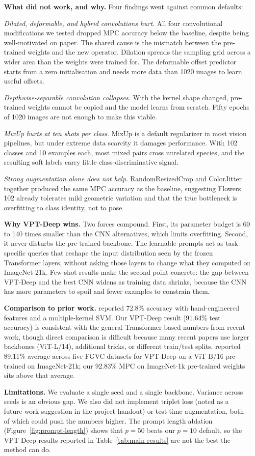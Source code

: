 \textbf{What did not work, and why.} Four findings went against common defaults:

\emph{Dilated, deformable, and hybrid convolutions hurt.} All four convolutional modifications we tested dropped MPC accuracy below the baseline, despite being well-motivated on paper. The shared cause is the mismatch between the pre-trained weights and the new operator. Dilation spreads the sampling grid across a wider area than the weights were trained for. The deformable offset predictor starts from a zero initialisation and needs more data than 1020 images to learn useful offsets.

\emph{Depthwise-separable convolution collapses.} With the kernel shape changed, pre-trained weights cannot be copied and the model learns from scratch. Fifty epochs of 1020 images are not enough to make this viable.

\emph{MixUp hurts at ten shots per class.} MixUp is a default regularizer in most vision pipelines, but under extreme data scarcity it damages performance. With 102 classes and 10 examples each, most mixed pairs cross unrelated species, and the resulting soft labels carry little class-discriminative signal.

\emph{Strong augmentation alone does not help.} RandomResizedCrop and ColorJitter together produced the same MPC accuracy as the baseline, suggesting Flowers 102 already tolerates mild geometric variation and that the true bottleneck is overfitting to class identity, not to pose.

\textbf{Why VPT-Deep wins.} Two forces compound. First, its parameter budget is 60 to 140 times smaller than the CNN alternatives, which limits overfitting. Second, it never disturbs the pre-trained backbone. The learnable prompts act as task-specific queries that reshape the input distribution seen by the frozen Transformer layers, without asking those layers to change what they computed on ImageNet-21k. Few-shot results make the second point concrete: the gap between VPT-Deep and the best CNN widens as training data shrinks, because the CNN has more parameters to spoil and fewer examples to constrain them.

\textbf{Comparison to prior work.} \citet{nilsback2008} reported 72.8\% accuracy with hand-engineered features and a multiple-kernel SVM. Our VPT-Deep result (91.64\% test accuracy) is consistent with the general Transformer-based numbers from recent work, though direct comparison is difficult because many recent papers use larger backbones (ViT-L/14), additional tricks, or different train/test splits. \citet{jia2022vpt} reported 89.11\% average across five FGVC datasets for VPT-Deep on a ViT-B/16 pre-trained on ImageNet-21k; our 92.83\% MPC on ImageNet-1k pre-trained weights sits above that average.

\textbf{Limitations.} We evaluate a single seed and a single backbone. Variance across seeds is an obvious gap. We also did not implement triplet loss (noted as a future-work suggestion in the project handout) or test-time augmentation, both of which could push the numbers higher. The prompt length ablation (Figure~\ref{fig:prompt-length}) shows that $p=50$ beats our $p=10$ default, so the VPT-Deep results reported in Table~\ref{tab:main-results} are not the best the method can do.
